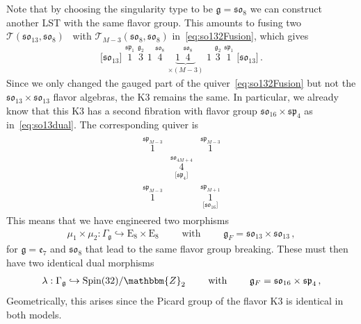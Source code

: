 \documentclass[11pt]{article}
\numberwithin{equation}{section}
\newcommand{\fso}{\mathfrak{so}}
\newcommand{\fsp}{\mathfrak{sp}}
\newcommand{\fg}{\mathfrak{g}}
\newcommand{\fe}{\mathfrak{e}}
\begin{document}
Note that by choosing the singularity type to be $\fg=\fso_8$ we can construct another LST with the same flavor group. This amounts to fusing two $\mathcal{T}(\fso_{13},\fso_8)$~\cite{Frey:2018vpw} with $\mathcal{T}_{M-3}(\fso_8,\fso_8)$ in~\eqref{eq:so132Fusion}, which gives
\begin{align}
\lbrack  \mathfrak{so}_{13}\rbrack     \, \,    
{\overset{\mathfrak{sp}_1}{1}} \, \,
{\overset{\mathfrak{g}_2}{3}} \, \,  
1 \, \, 
{\overset{\mathfrak{so}_8}{4}} \, \,
\underbrace{1 \, \,
{\overset{\mathfrak{so}_8}{4}} \, \,}_{\times (M-3)} \, \,
1 \, \,
{\overset{\mathfrak{g}_2}{3}} \, \, 
{\overset{\mathfrak{sp}_{1}}{1}} \, \,
\lbrack \mathfrak{so}_{13} \rbrack   \, .
\end{align}
Since we only changed the gauged part of the quiver~\eqref{eq:so132Fusion} but not the $\fso_{13}\times\fso_{13}$ flavor algebras, the K3 remains the same. In particular, we already know that this K3 has a second fibration with flavor group $\fso_{16}\times\fsp_4$ as in~\eqref{eq:so13dual}. The corresponding quiver is
\begin{align}
\begin{array}{ccc}
\overset{\mathfrak{sp}_{M-3}}{1} && \overset{\mathfrak{sp}_{M-3}}{1}  \\
 & \underset{\lbrack  \mathfrak{sp}_{4}\rbrack }{{\overset{\mathfrak{so}_{4M+4}}{4}}} & \\
\overset{\mathfrak{sp}_{M-3}}{1} && \underset{\lbrack \mathfrak{so}_{16} \rbrack}{\overset{\mathfrak{sp}_{M+1}}{1}}
\end{array}
\end{align}
This means that we have engineered two morphisms 
\begin{align}
    \mu_1 \times \mu_2: \Gamma_\fg \hookrightarrow \text{E}_8 \times \text{E}_8 \qquad\text{ with }\qquad \fg_F= \fso_{13}\times \fso_{13} \,,
\end{align}
for $\fg=\fe_7$ and $\fso_8$ that lead to the same flavor group breaking. These must then have two identical dual morphisms 
 \begin{align}
    \lambda: \Gamma_\fg \hookrightarrow \text{Spin(32)}/\mathbbm{Z}_2 \qquad\text{ with }\qquad  \fg_F= \fso_{16}\times \fsp_{4} \, ,
\end{align}
Geometrically, this arises since the Picard group of the flavor K3 is identical in both models.



\end{document}
